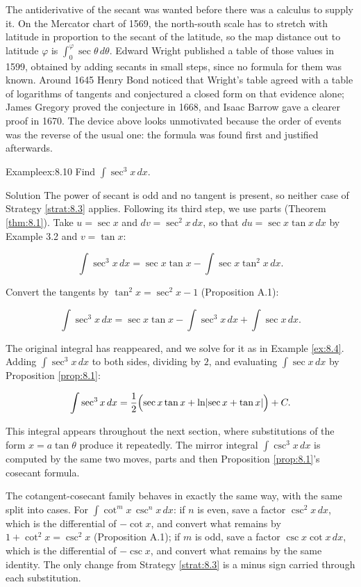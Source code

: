 \documentclass[a4paper,12pt,oneside]{memoir}
\begin{document}
The antiderivative of the secant was wanted before there was a calculus to supply it. On the Mercator chart of 1569, the north-south scale has to stretch with latitude in proportion to the secant of the latitude, so the map distance out to latitude \(\varphi\) is \(\int_{0}^{\varphi}\sec\theta\,d\theta\). Edward Wright published a table of those values in 1599, obtained by adding secants in small steps, since no formula for them was known. Around 1645 Henry Bond noticed that Wright’s table agreed with a table of logarithms of tangents and conjectured a closed form on that evidence alone; James Gregory proved the conjecture in 1668, and Isaac Barrow gave a clearer proof in 1670. The device above looks unmotivated because the order of events was the reverse of the usual one: the formula was found first and justified afterwards.

\begin{workedexample}
\begin{envexample}{Example}{ex:8.10}{}
Find \(\displaystyle\int \sec^{3}x\,dx\).
\end{envexample}
\begin{envsolution}{Solution}{}{}
The power of secant is odd and no tangent is present, so neither case of Strategy \ref{strat:8.3} applies. Following its third step, we use parts (Theorem \ref{thm:8.1}). Take \(u = \sec x\) and \(dv = \sec^{2}x\,dx\), so that \(du = \sec x\tan x\,dx\) by Example 3.2 and \(v = \tan x\):

\[ \int \sec^{3}x\,dx = \sec x\tan x - \int \sec x\tan^{2}x\,dx. \]

Convert the tangents by \(\tan^{2}x = \sec^{2}x - 1\) (Proposition A.1):

\[ \int \sec^{3}x\,dx = \sec x\tan x - \int \sec^{3}x\,dx + \int \sec x\,dx. \]

The original integral has reappeared, and we solve for it as in Example \ref{ex:8.4}. Adding \(\int\sec^{3}x\,dx\) to both sides, dividing by \(2\), and evaluating \(\int\sec x\,dx\) by Proposition \ref{prop:8.1}:

\[ \int \sec^{3}x\,dx = \frac{1}{2}\Bigl(\sec x\tan x + \ln\lvert\sec x + \tan x\rvert\Bigr) + C. \]

This integral appears throughout the next section, where substitutions of the form \(x = a\tan\theta\) produce it repeatedly. The mirror integral \(\int\csc^{3}x\,dx\) is computed by the same two moves, parts and then Proposition \ref{prop:8.1}’s cosecant formula. \qedmark
\end{envsolution}
\end{workedexample}
The cotangent-cosecant family behaves in exactly the same way, with the same split into cases. For \(\int\cot^{m}x\,\csc^{n}x\,dx\): if \(n\) is even, save a factor \(\csc^{2}x\,dx\), which is the differential of \(-\cot x\), and convert what remains by \(1 + \cot^{2}x = \csc^{2}x\) (Proposition A.1); if \(m\) is odd, save a factor \(\csc x\cot x\,dx\), which is the differential of \(-\csc x\), and convert what remains by the same identity. The only change from Strategy \ref{strat:8.3} is a minus sign carried through each substitution.
\end{document}
